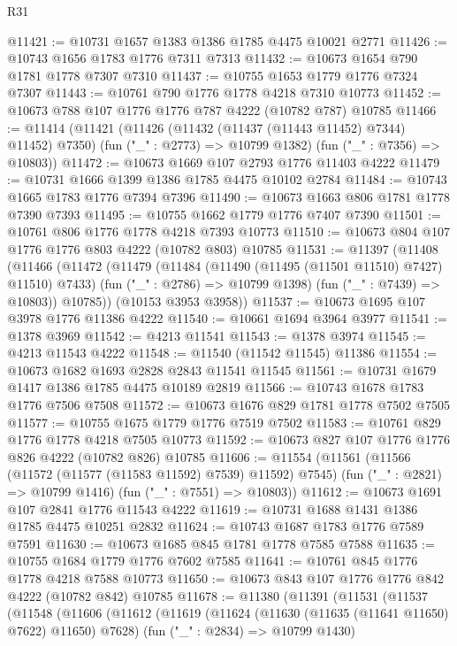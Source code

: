 \begin{lexlean}{R31}
\begin{coremodule}
@11421 := @10731 @1657 @1383 @1386 @1785 @4475 @10021 @2771
@11426 := @10743 @1656 @1783 @1776 @7311 @7313
@11432 := @10673 @1654 @790 @1781 @1778 @7307 @7310
@11437 := @10755 @1653 @1779 @1776 @7324 @7307
@11443 := @10761 @790 @1776 @1778 @4218 @7310 @10773
@11452 := @10673 @788 @107 @1776 @1776 @787 @4222 (@10782 @787) @10785
@11466 := @11414
    (@11421
      (@11426 (@11432 (@11437 (@11443 @11452) @7344) @11452) @7350)
      (fun ("_" : @2773) => @10799 @1382)
      (fun ("_" : @7356) => @10803))
@11472 := @10673 @1669 @107 @2793 @1776 @11403 @4222
@11479 := @10731 @1666 @1399 @1386 @1785 @4475 @10102 @2784
@11484 := @10743 @1665 @1783 @1776 @7394 @7396
@11490 := @10673 @1663 @806 @1781 @1778 @7390 @7393
@11495 := @10755 @1662 @1779 @1776 @7407 @7390
@11501 := @10761 @806 @1776 @1778 @4218 @7393 @10773
@11510 := @10673 @804 @107 @1776 @1776 @803 @4222 (@10782 @803) @10785
@11531 := @11397
    (@11408
      (@11466
        (@11472
          (@11479
            (@11484 (@11490 (@11495 (@11501 @11510) @7427) @11510) @7433)
            (fun ("_" : @2786) => @10799 @1398)
            (fun ("_" : @7439) => @10803))
          @10785))
      (@10153 @3953 @3958))
@11537 := @10673 @1695 @107 @3978 @1776 @11386 @4222
@11540 := @10661 @1694 @3964 @3977
@11541 := @1378 @3969
@11542 := @4213 @11541
@11543 := @1378 @3974
@11545 := @4213 @11543 @4222
@11548 := @11540 (@11542 @11545) @11386
@11554 := @10673 @1682 @1693 @2828 @2843 @11541 @11545
@11561 := @10731 @1679 @1417 @1386 @1785 @4475 @10189 @2819
@11566 := @10743 @1678 @1783 @1776 @7506 @7508
@11572 := @10673 @1676 @829 @1781 @1778 @7502 @7505
@11577 := @10755 @1675 @1779 @1776 @7519 @7502
@11583 := @10761 @829 @1776 @1778 @4218 @7505 @10773
@11592 := @10673 @827 @107 @1776 @1776 @826 @4222 (@10782 @826) @10785
@11606 := @11554
    (@11561
      (@11566 (@11572 (@11577 (@11583 @11592) @7539) @11592) @7545)
      (fun ("_" : @2821) => @10799 @1416)
      (fun ("_" : @7551) => @10803))
@11612 := @10673 @1691 @107 @2841 @1776 @11543 @4222
@11619 := @10731 @1688 @1431 @1386 @1785 @4475 @10251 @2832
@11624 := @10743 @1687 @1783 @1776 @7589 @7591
@11630 := @10673 @1685 @845 @1781 @1778 @7585 @7588
@11635 := @10755 @1684 @1779 @1776 @7602 @7585
@11641 := @10761 @845 @1776 @1778 @4218 @7588 @10773
@11650 := @10673 @843 @107 @1776 @1776 @842 @4222 (@10782 @842) @10785
@11678 := @11380
    (@11391
      (@11531
        (@11537
          (@11548
            (@11606
              (@11612
                (@11619
                  (@11624 (@11630 (@11635 (@11641 @11650) @7622) @11650) @7628)
                  (fun ("_" : @2834) => @10799 @1430)

\end{coremodule}
\end{lexlean}
